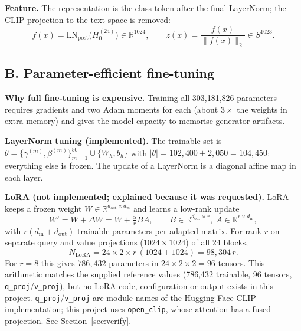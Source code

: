 \documentclass[10pt,a4paper]{article}
\begin{document}
\textbf{Feature.} The representation is the class token after the final LayerNorm; the CLIP
projection to the text space is removed:
\begin{equation}
f(x)=\mathrm{LN}_\text{post}\big(H^{(24)}_{0}\big)\in\mathbb{R}^{1024},\qquad
z(x)=\frac{f(x)}{\|f(x)\|_2}\in S^{1023}.
\end{equation}

\subsection{B. Parameter-efficient fine-tuning}\label{sec:peft}
\textbf{Why full fine-tuning is expensive.} Training all 303,181,826 parameters requires gradients
and two Adam moments for each (about \(3\times\) the weights in extra memory) and gives the model
capacity to memorise generator artifacts.

\textbf{LayerNorm tuning (implemented).} The trainable set is
\(\theta=\{\gamma^{(m)},\beta^{(m)}\}_{m=1}^{50}\cup\{W_h,b_h\}\) with \(|\theta|=102{,}400+2{,}050=104{,}450\);
everything else is frozen. The update of a LayerNorm is a diagonal affine map in each layer.

\textbf{LoRA (not implemented; explained because it was requested).} LoRA \cite{hu2022lora} keeps a
frozen weight \(W\in\mathbb{R}^{d_\text{out}\times d_\text{in}}\) and learns a low-rank update
\begin{equation}
W'=W+\Delta W=W+\tfrac{\alpha}{r}BA,\qquad B\in\mathbb{R}^{d_\text{out}\times r},\;A\in\mathbb{R}^{r\times d_\text{in}},
\end{equation}
with \(r(d_\text{in}+d_\text{out})\) trainable parameters per adapted matrix. For rank \(r\) on separate
query and value projections (\(1024\times1024\)) of all 24 blocks,
\begin{equation}\label{eq:lora}
N_\text{LoRA}=24\times2\times r\,(1024+1024)=98{,}304\,r .
\end{equation}
For \(r=8\) this gives \(786{,}432\) parameters in \(24\times2\times2=96\) tensors. This arithmetic
matches the supplied reference values (786,432 trainable, 96 tensors, \texttt{q\_proj}/\texttt{v\_proj}),
but no LoRA code, configuration or output exists in this project. \texttt{q\_proj}/\texttt{v\_proj}
are module names of the Hugging Face CLIP implementation; this project uses \texttt{open\_clip},
whose attention has a fused projection. See Section~\ref{sec:verify}.
\end{document}
